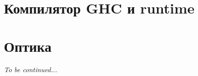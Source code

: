 \documentclass[12pt]{article}
\begin{document}
    \section{Компилятор GHC и runtime}




    \section{Оптика}



















    \begin{center}
        \vspace{2em}
        \textit{\LARGE To be continued...}
        \vspace{2em}
    \end{center}


    \newpage
    
\end{document}
